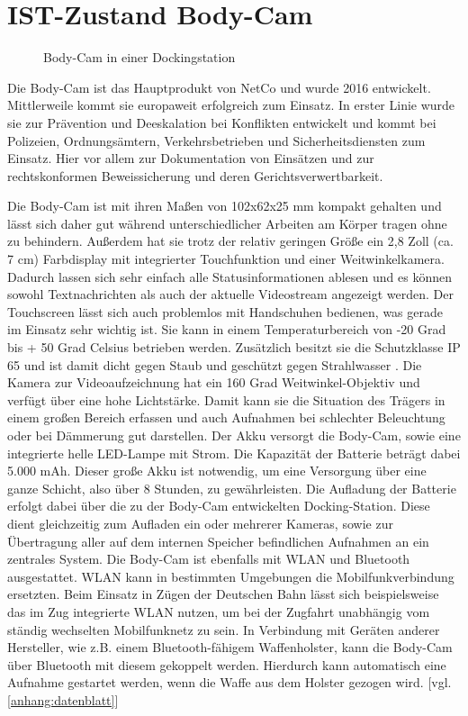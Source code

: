 \documentclass[thesis.tex]{subfiles}
\begin{document}
\section{IST-Zustand Body-Cam}

\begin{figure}[h]
    \centering
    \qquad
    \caption{Body-Cam in einer Dockingstation}
    \label{fig:BC_dock}
\end{figure}

Die Body-Cam ist das Hauptprodukt von NetCo und wurde 2016 entwickelt. Mittlerweile kommt sie europaweit erfolgreich zum Einsatz.
In erster Linie wurde sie zur Prävention und Deeskalation bei Konflikten entwickelt und kommt bei Polizeien, Ordnungsämtern, Verkehrsbetrieben und Sicherheitsdiensten zum Einsatz.
Hier vor allem zur Dokumentation von Einsätzen und zur rechtskonformen Beweissicherung und deren Gerichtsverwertbarkeit.

Die Body-Cam ist mit ihren Maßen von 102x62x25 mm kompakt gehalten und lässt sich daher gut während unterschiedlicher Arbeiten am Körper tragen ohne zu behindern.
Außerdem hat sie trotz der relativ geringen Größe ein 2,8 Zoll (ca. 7 cm) Farbdisplay mit integrierter Touchfunktion und einer Weitwinkelkamera. Dadurch lassen sich sehr einfach alle Statusinformationen ablesen und es können sowohl Textnachrichten als auch der aktuelle Videostream angezeigt werden.
Der Touchscreen lässt sich auch problemlos mit Handschuhen bedienen, was gerade im Einsatz sehr wichtig ist.
Sie kann in einem Temperaturbereich von -20 Grad bis + 50 Grad Celsius betrieben werden.
Zusätzlich besitzt sie die Schutzklasse IP 65 und ist damit dicht gegen Staub und geschützt gegen Strahlwasser \cite[S.44]{Elektro_Baugruppen}.
Die Kamera zur Videoaufzeichnung hat ein 160 Grad Weitwinkel-Objektiv und verfügt über eine hohe Lichtstärke.
Damit kann sie die Situation des Trägers in einem großen Bereich erfassen und auch Aufnahmen bei schlechter Beleuchtung oder bei Dämmerung gut darstellen.
Der Akku versorgt die Body-Cam, sowie eine integrierte helle LED-Lampe mit Strom.
Die Kapazität der Batterie beträgt dabei 5.000 mAh.
Dieser große Akku ist notwendig, um eine Versorgung über eine ganze Schicht, also über 8 Stunden, zu gewährleisten.
Die Aufladung der Batterie erfolgt dabei über die zu der Body-Cam entwickelten Docking-Station.
Diese dient gleichzeitig zum Aufladen ein oder mehrerer Kameras, sowie zur Übertragung aller auf dem internen Speicher befindlichen Aufnahmen an ein zentrales System.
Die Body-Cam ist ebenfalls mit WLAN und Bluetooth ausgestattet.
WLAN kann in bestimmten Umgebungen die Mobilfunkverbindung ersetzten.
Beim Einsatz in Zügen der Deutschen Bahn lässt sich beispielsweise das im Zug integrierte WLAN nutzen, um bei der Zugfahrt unabhängig vom ständig wechselten Mobilfunknetz zu sein.
In Verbindung mit Geräten anderer Hersteller, wie z.B. einem Bluetooth-fähigem Waffenholster, kann die Body-Cam über Bluetooth mit diesem gekoppelt werden.
Hierdurch kann automatisch eine Aufnahme gestartet werden, wenn die Waffe aus dem Holster gezogen wird.
[vgl. \autoref{anhang:datenblatt}]
\end{document}
